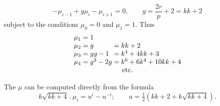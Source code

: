 \[
-\mu_{i-1}+g\mu_i-\mu_{i+1}=0,\qquad g=\frac{2r}p+2=kk+2
\]
\noindent subject to the conditions $\mu_0=0$ and $\mu_1=1$. Thus
\[
\begin{array}{r@{\;}c@{\;}l@{\;}c@{\;}l}
\mu_1&=&1&&\\
\mu_2&=&g&=&kk+2\\
\mu_3&=&gg-1&=&k^4+4kk+3\\
\mu_4&=&g^3-2g&=&k^6+6k^4+10kk+4\\
\multicolumn{5}{c}{\text{etc.}}
\end{array}
\]
\par\noindent\hspace*{\parindent}The $\mu$ can be computed directly from the formula
\[
k\sqrt{kk+4}\,.\,\mu_i=u^i-u^{-i};\qquad u=\tfrac12(kk+2+k\sqrt{kk+4}).
\]
\par\endgroup

